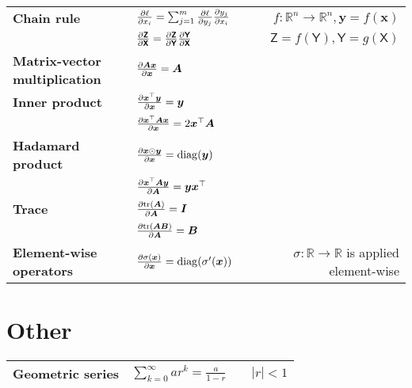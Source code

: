 \documentclass{article}
\newcommand{\lft}{\mathopen{}\mathclose\bgroup\left}
\newcommand{\rgt}{\aftergroup\egroup\right}
\newcommand{\R}{\mathbb{R}}
\renewcommand{\vec}[1]{\bm{#1}}
\newcommand{\mat}[1]{\bm{#1}}
\newcommand{\tens}[1]{\bm{\mathsf{#1}}}
\newcommand{\transpose}[1]{#1^\top}
\newcommand{\trace}[1]{\mathrm{tr}\lft(#1\rgt)}
\begin{document}
\begin{xltabular}{\textwidth}{@{}llXr@{}}
    \toprule
    \textbf{Chain rule} & $\pdv{\ell}{x_i} = \sum_{j=1}^{m} \pdv{\ell}{y_j} \pdv{y_j}{x_i}$ & & $f: \R^n \to \R^n, \vec{y} = f(\vec{x})$ \\
    & $\pdv{\tens{Z}}{\tens{X}} = \pdv{\tens{Z}}{\tens{Y}} \pdv{\tens{Y}}{\tens{X}}$ & & $\tens{Z} = f(\tens{Y}), \tens{Y} = g(\tens{X})$ \\
    \textbf{Matrix-vector multiplication} & $\pdv{\mat{A} \vec{x}}{\vec{x}} = \mat{A}$ \\
    \textbf{Inner product} & $\pdv{\transpose{\vec{x}} \vec{y}}{\vec{x}} = \vec{y}$ \\
    & $\pdv{\transpose{\vec{x}} \mat{A} \vec{x}}{\mat{x}} = 2 \transpose{\vec{x}} \mat{A}$ \\
    \textbf{Hadamard product} & $\pdv{\vec{x} \odot \vec{y}}{\vec{x}} = \mathrm{diag}(\vec{y})$ \\
    & $\pdv{\transpose{\vec{x}} \mat{A} \vec{y}}{\mat{A}} = \vec{y} \transpose{\vec{x}}$ \\
    \textbf{Trace} & $\pdv{\trace{\mat{A}}}{\mat{A}} = \mat{I}$ \\
    & $\pdv{\trace{\mat{A} \mat{B}}}{\mat{A}} = \mat{B}$ \\
    \textbf{Element-wise operators} & $\pdv{\sigma(\vec{x})}{\vec{x}} = \mathrm{diag}(\sigma'(\vec{x}))$ & & $\sigma: \R \to \R$ is applied element-wise \\
    \bottomrule
\end{xltabular}

\section*{Other}

\begin{xltabular}{\textwidth}{@{}llXr@{}}
    \toprule
    \textbf{Geometric series} & $\sum_{k=0}^{\infty} ar^k = \frac{a}{1-r}$ & & $|r| < 1$ \\
    \bottomrule
\end{xltabular}
\end{document}
